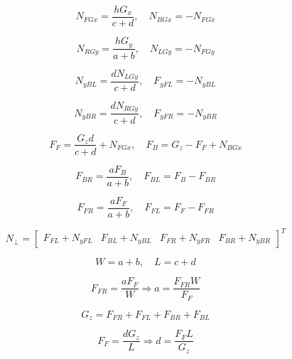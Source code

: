 \fi

\begin{equation}
    N_{FGx}=\frac{hG_x}{c+d}
    ,\quad
    N_{BGx}= - N_{FGx}
\end{equation}

\begin{equation}
    N_{RGy}=\frac{hG_y}{a+b}
    ,\quad
    N_{LGy}= - N_{FGy}
\end{equation}

\begin{equation}
N_{yBL}=\frac{dN_{LGy}}{c+d}
    ,\quad
F_{yFL}=-N_{yBL}
\end{equation}

\begin{equation}
N_{yBR}=\frac{dN_{RGy}}{c+d}
    ,\quad
F_{yFR}=-N_{yBR}
\end{equation}


\begin{equation}
F_F = \frac{G_zd}{c+d} + N_{FGx}
    ,\quad
F_B = G_z-F_F + N_{BGx}
\end{equation}

\begin{equation}
F_{BR}=\frac{aF_B}{a+b}
    ,\quad
F_{BL}=F_{B}-F_{BR}
\end{equation}

\begin{equation}
F_{FR}=\frac{aF_F}{a+b}
    ,\quad
F_{FL}=F_{F}-F_{FR}
\end{equation}

\begin{equation}
N_\perp =\begin{bmatrix}
F_{FL} + N_{yFL} & F_{BL} +  N_{yBL} & F_{FR} +  N_{yFR} & F_{BR} +  N_{yBR}
\end{bmatrix}^T
\end{equation}


\begin{equation}
W = a+b,\quad L = c+d
\end{equation}

\begin{equation}
F_{FR}=\frac{aF_F}{W} \Rightarrow a = \frac{F_{FR}W}{F_F}
\end{equation}

\begin{equation}
G_{z}=F_{FR}+ F_{FL}+ F_{BR}+ F_{BL} 
\end{equation}

\begin{equation}
F_{F}=\frac{dG_z}{L} \Rightarrow d = \frac{F_{F}L}{G_z}
\end{equation}









